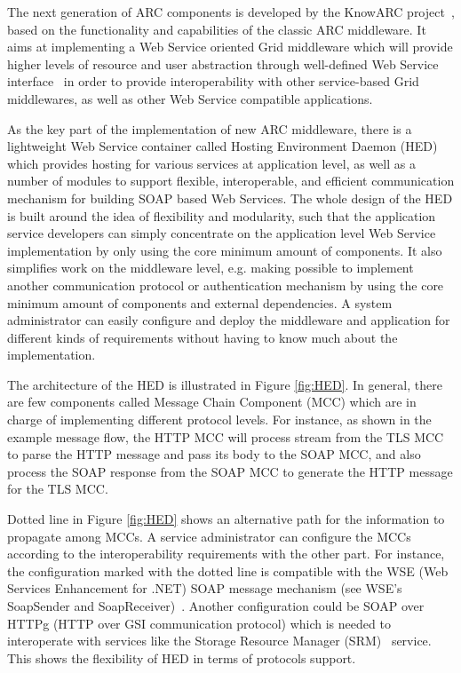 \documentclass[twocolumn]{svjour3}         %
\begin{document}
The next generation of ARC components is developed by the KnowARC project~\cite{KnowARClink}, based on the functionality and capabilities of the classic ARC middleware. It aims at implementing a Web Service oriented Grid middleware which will provide higher levels of resource and user abstraction through well-defined Web Service interface~\cite{KnowARCDesignlink} in order to provide interoperability with other service-based Grid middlewares, as well as other Web Service compatible applications.

As the key part of the implementation of new ARC middleware, there is a lightweight Web Service container called Hosting Environment Daemon (HED) which provides hosting for various services at application level, as well as a number of modules to support flexible, interoperable, and efficient communication mechanism for building SOAP based Web Services. The whole design of the HED is built around the idea of flexibility and modularity, such that the application service developers can simply concentrate on the application level Web Service implementation by only using the core minimum amount of components. It also simplifies work on the middleware level, e.g. making possible to implement another communication protocol or authentication mechanism by using the core minimum amount of components and external dependencies. A system administrator can easily configure and deploy the middleware and application for different kinds of requirements without having to know much about the implementation. 

The architecture of the HED is illustrated in Figure \ref{fig:HED}. In general, there are few components called Message Chain Component (MCC) which are in charge of implementing different protocol levels. For instance, as shown in the example message flow, the HTTP MCC will process stream from the TLS MCC to parse the HTTP message and pass its body to the SOAP MCC, and also process the SOAP response from the SOAP MCC to generate the HTTP message for the TLS MCC.

Dotted line in Figure \ref{fig:HED} shows an alternative path for the information to propagate among MCCs. A service administrator can configure the MCCs according to the interoperability requirements with the other part. For instance, the configuration marked with the dotted line is compatible with the WSE (Web Services Enhancement for .NET) SOAP message mechanism (see WSE's SoapSender and SoapReceiver)~\cite{WSElink}. Another configuration could be SOAP over HTTPg (HTTP over GSI communication protocol) which is needed to interoperate with services like the Storage Resource Manager (SRM)~\cite{AShoshani03} service. This shows the flexibility of HED in terms of protocols support.
\end{document}
